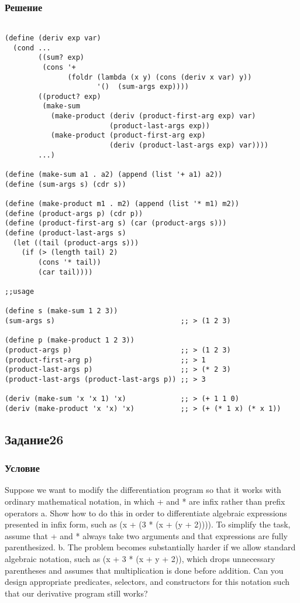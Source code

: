 \documentclass[10pt,a4paper]{article}
\begin{document}
\subsubsection*{Решение}
\begin{lstlisting}

(define (deriv exp var)
  (cond ...
        ((sum? exp)
         (cons '+
               (foldr (lambda (x y) (cons (deriv x var) y))
                      '()  (sum-args exp))))
        ((product? exp)
         (make-sum
           (make-product (deriv (product-first-arg exp) var)
                         (product-last-args exp))
           (make-product (product-first-arg exp)
                         (deriv (product-last-args exp) var))))
        ...)

(define (make-sum a1 . a2) (append (list '+ a1) a2))
(define (sum-args s) (cdr s))

(define (make-product m1 . m2) (append (list '* m1) m2))
(define (product-args p) (cdr p))
(define (product-first-arg s) (car (product-args s)))
(define (product-last-args s)
  (let ((tail (product-args s)))
    (if (> (length tail) 2)
        (cons '* tail))
        (car tail))))

;;usage

(define s (make-sum 1 2 3))
(sum-args s)                              ;; > (1 2 3)

(define p (make-product 1 2 3))
(product-args p)                          ;; > (1 2 3)
(product-first-arg p)                     ;; > 1
(product-last-args p)                     ;; > (* 2 3)
(product-last-args (product-last-args p)) ;; > 3

(deriv (make-sum 'x 'x 1) 'x)             ;; > (+ 1 1 0)
(deriv (make-product 'x 'x) 'x)           ;; > (+ (* 1 x) (* x 1))

\end{lstlisting}

\subsection*{Задание26}
\subsubsection*{Условие}
Suppose we want to modify the differentiation program so that it works with ordinary mathematical notation, in which + and * are infix rather than prefix operators
a. Show how to do this in order to differentiate algebraic expressions
presented in infix form, such as (x + (3 * (x + (y + 2)))). To
simplify the task, assume that + and * always take two arguments and
that expressions are fully parenthesized.
b. The problem becomes substantially harder if we allow standard algebraic notation, such as (x + 3 * (x + y + 2)), which drops unnecessary parentheses and assumes that multiplication is done before addition. Can you design appropriate predicates, selectors, and constructors for this notation such that our derivative program still works? 
\end{document}
